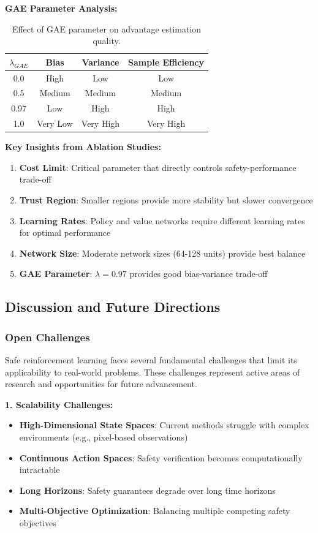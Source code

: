 \documentclass[12pt]{article}
\begin{document}
{{{{\textbf{GAE Parameter Analysis:}
\begin{table}[H]
\centering
\begin{tabular}{|c|c|c|c|}
\hline
\textbf{$\lambda_{GAE}$} & \textbf{Bias} & \textbf{Variance} & \textbf{Sample Efficiency} \\
\hline
0.0 & High & Low & Low \\
0.5 & Medium & Medium & Medium \\
0.97 & Low & High & High \\
1.0 & Very Low & Very High & Very High \\
\hline
\end{tabular}
\caption{Effect of GAE parameter on advantage estimation quality.}
\end{table}

\textbf{Key Insights from Ablation Studies:}
\begin{enumerate}
\item \textbf{Cost Limit}: Critical parameter that directly controls safety-performance trade-off
\item \textbf{Trust Region}: Smaller regions provide more stability but slower convergence
\item \textbf{Learning Rates}: Policy and value networks require different learning rates for optimal performance
\item \textbf{Network Size}: Moderate network sizes (64-128 units) provide best balance
\item \textbf{GAE Parameter}: $\lambda = 0.97$ provides good bias-variance trade-off
\end{enumerate}

\subsection{Discussion and Future Directions}

\subsubsection{Open Challenges}

Safe reinforcement learning faces several fundamental challenges that limit its applicability to real-world problems. These challenges represent active areas of research and opportunities for future advancement.

\textbf{1. Scalability Challenges:}
\begin{itemize}
\item \textbf{High-Dimensional State Spaces}: Current methods struggle with complex environments (e.g., pixel-based observations)
\item \textbf{Continuous Action Spaces}: Safety verification becomes computationally intractable
\item \textbf{Long Horizons}: Safety guarantees degrade over long time horizons
\item \textbf{Multi-Objective Optimization}: Balancing multiple competing safety objectives
\end{itemize}

}}}}
\end{document}
